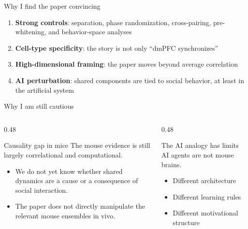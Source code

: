 \documentclass[aspectratio=169,11pt]{beamer}
\begin{document}
\begin{frame}{Why I find the paper convincing}
\begin{enumerate}
  \item \textbf{Strong controls}: separation, phase randomization, cross-pairing, pre-whitening, and behavior-space analyses
  \item \textbf{Cell-type specificity}: the story is not only ``dmPFC synchronizes''
  \item \textbf{High-dimensional framing}: the paper moves beyond average correlation
  \item \textbf{AI perturbation}: shared components are tied to social behavior, at least in the artificial system
\end{enumerate}
\end{frame}

\begin{frame}{Why I am still cautious}
\begin{columns}[T]
  \begin{column}{0.48\textwidth}
    \begin{alertblock}{Causality gap in mice}
    The mouse evidence is still largely correlational and computational.
    \end{alertblock}
    \begin{itemize}
      \item We do not yet know whether shared dynamics are a cause or a consequence of social interaction.
      \item The paper does not directly manipulate the relevant mouse ensembles in vivo.
    \end{itemize}
  \end{column}
  \begin{column}{0.48\textwidth}
    \begin{alertblock}{The AI analogy has limits}
    AI agents are not mouse brains.
    \end{alertblock}
    \begin{itemize}
      \item Different architecture
      \item Different learning rules
      \item Different motivational structure
    \end{itemize}
  \end{column}
\end{columns}
\end{frame}
\end{document}

